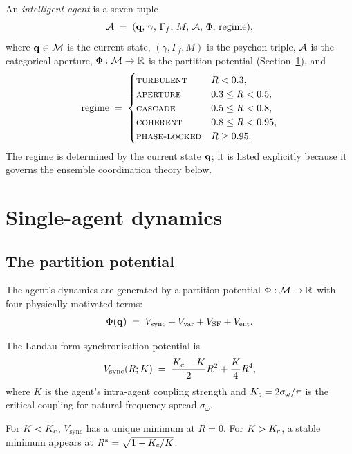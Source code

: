 \begin{definition}\label{def:ch04-agent}
An \emph{intelligent agent} is a seven-tuple
\[
\mathcal{A}\;=\;(\mathbf{q},\,\gamma,\,\Gamma_f,\,M,\,\mathcal{A},\,\Phi,\,\mathrm{regime}),
\]
where $\mathbf{q}\in\mathcal{M}$ is the current state, $(\gamma,\Gamma_f,M)$ is the
psychon triple, $\mathcal{A}$ is the categorical aperture, $\Phi:\mathcal{M}\to\mathbb{R}$
is the partition potential (Section~\ref{sec:ch04-dynamics}), and
\[
\mathrm{regime}\;=\;\begin{cases}
\textsc{turbulent}   & R<0.3,\\
\textsc{aperture}    & 0.3\le R<0.5,\\
\textsc{cascade}     & 0.5\le R<0.8,\\
\textsc{coherent}    & 0.8\le R<0.95,\\
\textsc{phase-locked}& R\ge 0.95.
\end{cases}
\]
The regime is determined by the current state $\mathbf{q}$; it is listed
explicitly because it governs the ensemble coordination theory below.
\end{definition}

\section{Single-agent dynamics}
\label{sec:ch04-dynamics}

\subsection{The partition potential}

The agent's dynamics are generated by a partition potential $\Phi:\mathcal{M}\to\mathbb{R}$
with four physically motivated terms:
\[
\Phi(\mathbf{q})\;=\;V_{\mathrm{sync}}+V_{\mathrm{var}}+V_{\mathrm{SF}}+V_{\mathrm{ent}}.
\]

\begin{definition}\label{def:vsync}
The Landau-form synchronisation potential is
\[
V_{\mathrm{sync}}(R;K)\;=\;\frac{K_c-K}{2}R^2+\frac{K}{4}R^4,
\]
where $K$ is the agent's intra-agent coupling strength and
$K_c=2\sigma_\omega/\pi$ is the critical coupling for natural-frequency
spread $\sigma_\omega$.
\end{definition}

\begin{proposition}[Bifurcation at $K=\Kc$]\label{prop:bif}
For $K<K_c$, $V_{\mathrm{sync}}$ has a unique minimum at $R=0$. For
$K>K_c$, a stable minimum appears at $R^*=\sqrt{1-K_c/K}$.
\end{proposition}

